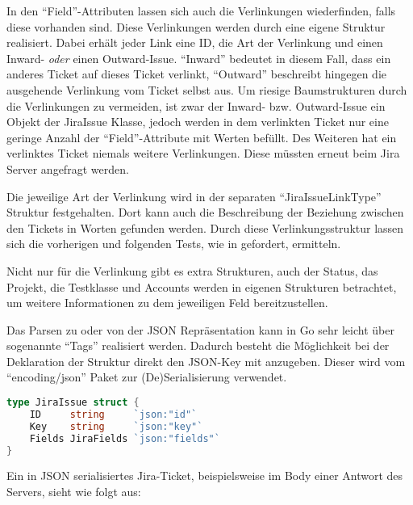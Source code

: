 In den ``Field''-Attributen lassen sich auch die Verlinkungen wiederfinden, falls 
diese vorhanden sind. Diese Verlinkungen werden durch eine eigene Struktur realisiert.
Dabei erhält jeder Link eine ID, die Art der Verlinkung und einen Inward- \textit{oder}
einen Outward-Issue. ``Inward'' bedeutet in diesem Fall, dass ein anderes Ticket auf dieses
Ticket verlinkt, ``Outward'' beschreibt hingegen die ausgehende Verlinkung vom Ticket selbst aus. 
Um riesige Baumstrukturen durch die Verlinkungen zu vermeiden, 
ist zwar der Inward- bzw. Outward-Issue ein Objekt der JiraIssue Klasse, jedoch 
werden in dem verlinkten Ticket nur eine geringe Anzahl der ``Field''-Attribute mit Werten befüllt.
Des Weiteren hat ein verlinktes Ticket niemals weitere Verlinkungen. Diese müssten erneut
beim Jira Server angefragt werden.

Die jeweilige Art der Verlinkung wird in der separaten 
``JiraIssueLinkType'' Struktur festgehalten. Dort kann auch die Beschreibung
der Beziehung zwischen den Tickets in Worten gefunden werden. Durch diese Verlinkungsstruktur
lassen sich die vorherigen und folgenden Tests, wie in 
gefordert, ermitteln.

Nicht nur für die Verlinkung gibt es extra Strukturen, auch der Status, das Projekt, 
die Testklasse und Accounts werden in eigenen Strukturen betrachtet, um weitere
Informationen zu dem jeweiligen Feld bereitzustellen.

Das Parsen zu oder von der \gls{JSON} Repräsentation kann in Go sehr leicht über
sogenannte ``Tags'' realisiert werden. Dadurch besteht die Möglichkeit bei der 
Deklaration der Struktur direkt den \gls{JSON}-Key mit anzugeben. Dieser wird
vom ``encoding/json'' Paket zur (De)Serialisierung verwendet.

\begin{lstlisting}[caption=Go Strukturdefinition mit JSON Tags,language=Go]
type JiraIssue struct {
    ID     string     `json:"id"`
    Key    string     `json:"key"`
    Fields JiraFields `json:"fields"`
}
\end{lstlisting}

Ein in \gls{JSON} serialisiertes Jira-Ticket, beispielsweise im Body einer Antwort
des Servers, sieht wie folgt aus:

